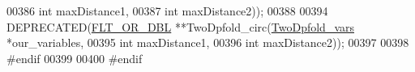 \begin{DoxyCode}
00386                                   \textcolor{keywordtype}{int}             maxDistance1,
00387                                   \textcolor{keywordtype}{int}             maxDistance2));
00388 
00394 DEPRECATED(\hyperlink{group__data__structures_ga31125aeace516926bf7f251f759b6126}{FLT\_OR\_DBL} **TwoDpfold\_circ(\hyperlink{structTwoDpfold__vars}{TwoDpfold\_vars} *our\_variables,
00395                                        \textcolor{keywordtype}{int}            maxDistance1,
00396                                        \textcolor{keywordtype}{int}            maxDistance2));
00397 
00398 \textcolor{preprocessor}{#endif}
00399 
00400 \textcolor{preprocessor}{#endif}
\end{DoxyCode}
